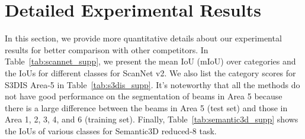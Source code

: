 \documentclass[final]{cvpr}
\begin{document}
\section{Detailed Experimental Results}
\label{sec:experiment}

In this section, we provide more quantitative details about our experimental results for better comparison with other competitors. In Table~\ref{tab:scannet_supp}, we present the mean IoU (mIoU) over categories and the IoUs for different classes for ScanNet v2. We also list the category scores for S3DIS Area-5 in Table~\ref{tab:s3dis_supp}. It's noteworthy that all the methods do not have good performance on the segmentation of beams in Area 5 because there is a large difference between the beams in Area 5 (test set) and those in Area 1, 2, 3, 4, and 6 (training set). Finally, Table~\ref{tab:semantic3d_supp} shows the IoUs of various classes for Semantic3D reduced-8 task.
\end{document}
